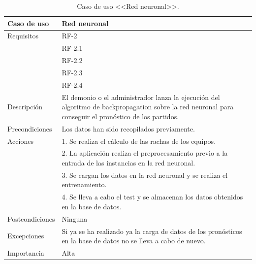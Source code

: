  \begin{table}
  \begin{center}
   \begin{tabular}{|p{3cm} | p{9cm} |}
    \hline
    Caso de uso & Red neuronal\\
    \hline
    Requisitos & RF-2\\
	    & RF-2.1\\
	    & RF-2.2\\
    	& RF-2.3\\
    	& RF-2.4\\
    \hline
    Descripción & El demonio o el administrador lanza la ejecución del algoritmo de backpropagation sobre la red neuronal para conseguir el pronóstico de los partidos.\\
    \hline
    Precondiciones &Los datos han sido recopilados previamente.\\
    \hline
    Acciones & 1. Se realiza el cálculo de las rachas de los equipos. \\
    &2. La aplicación realiza el preprocesamiento previo a la entrada de las instancias en la red neuronal.\\
    &3. Se cargan los datos en la red neuronal y se realiza el entrenamiento.\\
    &4. Se lleva a cabo el test y se almacenan los datos obtenidos en la base de datos.\\
    \hline
    Postcondiciones & Ninguna \\
    \hline
    Excepciones & Si ya se ha realizado ya la carga de datos de los pronósticos en la base de datos no se lleva a cabo de nuevo. \\
    \hline
    Importancia & Alta \\
    \hline
   \end{tabular}
   \caption{Caso de uso <<Red neuronal>>.}
   \label{tabla:casoUso2}
  \end{center}
 \end{table} 
 

